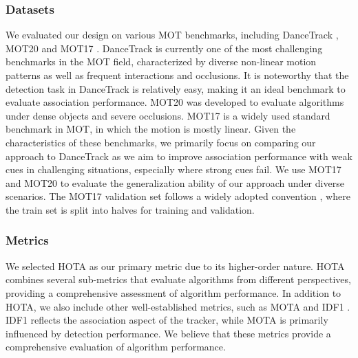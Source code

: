\documentclass[letterpaper]{article} \usepackage{aaai23}  \usepackage{times}  \usepackage{helvet}  \usepackage{courier}  \usepackage[hyphens]{url}  \usepackage{graphicx} \urlstyle{rm} \def\UrlFont{\rm}  \usepackage{natbib}  \usepackage{caption} \frenchspacing  \setlength{\pdfpagewidth}{8.5in}  \setlength{\pdfpageheight}{11in}  \usepackage{algorithm}
\begin{document}
\subsubsection{Datasets}
We evaluated our design on various MOT benchmarks, including DanceTrack \textcolor{blue}{\cite{sun2022dancetrack}}, MOT20 \textcolor{blue}{\cite{dendorfer2020mot20}} and MOT17 \textcolor{blue}{\cite{milan2016mot16}}. DanceTrack is currently one of the most challenging benchmarks in the MOT field, characterized by diverse non-linear motion patterns as well as frequent interactions and occlusions. It is noteworthy that the detection task in DanceTrack is relatively easy, making it an ideal benchmark to evaluate association performance. MOT20 was developed to evaluate algorithms under dense objects and severe occlusions. MOT17 is a widely used standard benchmark in MOT, in which the motion is mostly linear. Given the characteristics of these benchmarks, we primarily focus on comparing our approach to DanceTrack as we aim to improve association performance with weak cues in challenging situations, especially where strong cues fail. We use MOT17 and MOT20 to evaluate the generalization ability of our approach under diverse scenarios. The MOT17 validation set follows a widely adopted convention \textcolor{blue}{\cite{zhou2020tracking}}, where the train set is split into halves for training and validation.  



\subsubsection{Metrics}
We selected HOTA\textcolor{blue}{\cite{luiten2021hota}} as our primary metric due to its higher-order nature. HOTA 
combines several sub-metrics that evaluate algorithms from different perspectives, providing a comprehensive assessment of algorithm performance. In addition to HOTA, we also include other well-established metrics, such as MOTA \textcolor{blue}{\cite{bernardin2008evaluating}} and IDF1 \textcolor{blue}{\cite{ristani2016performance}}. IDF1 reflects the association aspect of the tracker, while MOTA is primarily influenced by detection performance. We believe that these metrics provide a comprehensive evaluation of algorithm performance. 
\end{document}
